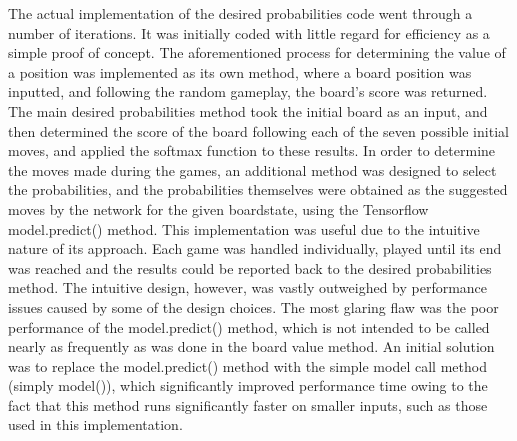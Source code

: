 \documentclass[12pt]{article}
\begin{document}
The actual implementation of the desired probabilities code went through a number of iterations. It was initially coded with little regard for efficiency as a simple proof of concept. The aforementioned process for determining the value of a position was implemented as its own method, where a board position was inputted, and following the random gameplay, the board’s score was returned. The main desired probabilities method took the initial board as an input, and then determined the score of the board following each of the seven possible initial moves, and applied the softmax function to these results. In order to determine the moves made during the games, an additional method was designed to select the probabilities, and the probabilities themselves were obtained as the suggested moves by the network for the given boardstate, using the Tensorflow model.predict() method. This implementation was useful due to the intuitive nature of its approach. Each game was handled individually, played until its end was reached and the results could be reported back to the desired probabilities method. The intuitive design, however, was vastly outweighed by performance issues caused by some of the design choices. The most glaring flaw was the poor performance of the model.predict() method, which is not intended to be called nearly as frequently as was done in the board value method. An initial solution was to replace the model.predict() method with the simple model call method (simply model()), which significantly improved performance time owing to the fact that this method runs significantly faster on smaller inputs, such as those used in this implementation.
\end{document}
